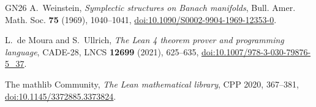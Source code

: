 \begin{thebibliography}{GN26}
A.~Weinstein, \emph{Symplectic structures on Banach manifolds}, Bull. Amer. Math. Soc. \textbf{75}
(1969), 1040--1041,
\href{https://doi.org/10.1090/S0002-9904-1969-12353-0}{doi:10.1090/S0002-9904-1969-12353-0}.

L.~de Moura and S.~Ullrich, \emph{The Lean 4 theorem prover and programming language}, CADE-28,
LNCS \textbf{12699} (2021), 625--635, \href{https://doi.org/10.1007/978-3-030-79876-5_37}{doi:10.1007/978-3-030-79876-5\_37}.

The mathlib Community, \emph{The Lean mathematical library}, CPP 2020, 367--381, \href{https://doi.org/10.1145/3372885.3373824}{doi:10.1145/3372885.3373824}.

\end{thebibliography}
